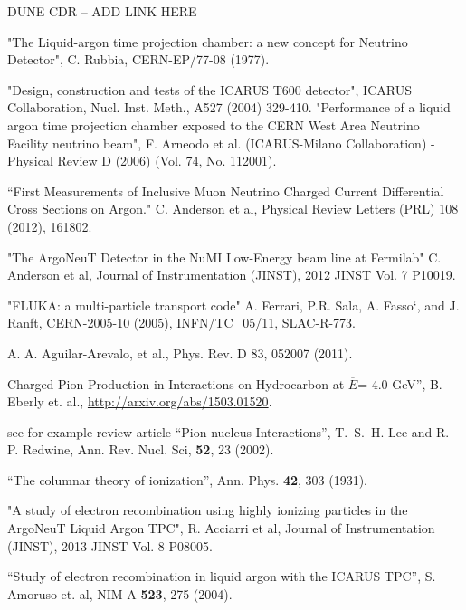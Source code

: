 \begin{thebibliography}{99}

%
%

%
%

 DUNE CDR -- ADD LINK HERE

"The Liquid-argon time projection chamber: a new concept for Neutrino Detector", C. Rubbia, CERN-EP/77-08 (1977).

 "Design, construction and tests of the ICARUS T600 detector", ICARUS Collaboration, Nucl. Inst. Meth., A527 (2004) 329-410. 
"Performance of a liquid argon time projection chamber exposed to the CERN West Area Neutrino Facility neutrino beam", F. Arneodo et al. (ICARUS-Milano Collaboration) - Physical Review D (2006) (Vol. 74, No. 112001). 

 ``First Measurements of Inclusive Muon Neutrino Charged Current Differential Cross Sections on Argon." C. Anderson et al, Physical Review Letters (PRL) 108 (2012), 161802. 

 "The ArgoNeuT Detector in the NuMI Low-Energy beam line at Fermilab" C. Anderson et al, Journal of Instrumentation (JINST), 2012 JINST Vol. 7 P10019. 

 "FLUKA: a multi-particle transport code" A. Ferrari, P.R. Sala, A. Fasso`, and J. Ranft, CERN-2005-10 (2005), INFN/TC\_05/11, SLAC-R-773.

  A. A. Aguilar-Arevalo, et al.,
Phys. Rev. D 83, 052007 (2011).

 Charged Pion Production in Interactions on Hydrocarbon 
at $\overline{E}$= 4.0 GeV'', B. Eberly et. al., \url{http://arxiv.org/abs/1503.01520}.

 see for example review article ``Pion-nucleus Interactions'',
T.~S.~H. Lee and R. P. Redwine, Ann. Rev. Nucl. Sci,  {\bf 52}, 23 (2002).

 ``The columnar theory of ionization'', Ann. Phys. {\bf 42}, 303 (1931).

 "A study of electron recombination using highly ionizing particles in the ArgoNeuT Liquid Argon TPC", 
R. Acciarri et al, Journal of Instrumentation 
(JINST), 2013 JINST Vol. 8 P08005.

 ``Study of electron recombination in liquid argon with the ICARUS TPC'', S. Amoruso et. al, NIM A {\bf 523}, 275 (2004). 


\end{thebibliography}
